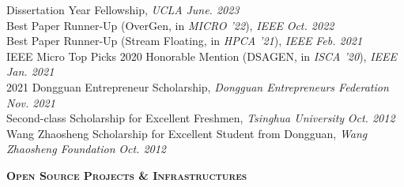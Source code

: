 \documentclass[a4paper]{article}
\newenvironment{changemargin}[2]{%
  \begin{list}{}{%
    \setlength{\topsep}{0pt}%
    \setlength{\leftmargin}{#1}%
    \setlength{\rightmargin}{#2}%
    \setlength{\listparindent}{\parindent}%
    \setlength{\itemindent}{\parindent}%
    \setlength{\parsep}{\parskip}%
  }%
  \item[]}{\end{list}
}
\newcommand{\lineover}{
	\begin{changemargin}{-0.05in}{-0.05in}
		\vspace*{-8pt}
		\hrulefill \\
		\vspace*{-2pt}
	\end{changemargin}
}
\newcommand{\header}[1]{
	\begin{changemargin}{-0.5in}{-0.5in}
		\scshape{\large \textbf{#1}}\\
  	\lineover
	\end{changemargin}
}
\newenvironment{body} {
	\vspace*{-16pt}
	\begin{changemargin}{-0.5in}{-0.5in}
  }	
	{\end{changemargin}
}
\begin{document}
\begin{body}
	\vspace{14pt}
	Dissertation Year Fellowship, \emph{UCLA} \hfill{} \emph{June. 2023}\\
	\smallskip
	Best Paper Runner-Up (OverGen, in \emph{MICRO '22}), \emph{IEEE} \hfill{} \emph{Oct. 2022}\\
	\smallskip
	Best Paper Runner-Up (Stream Floating, in \emph{HPCA '21}), \emph{IEEE} \hfill{} \emph{Feb. 2021}\\
	\smallskip
	IEEE Micro Top Picks 2020 Honorable Mention (DSAGEN, in \emph{ISCA '20}), \emph{IEEE} \hfill{} \emph{Jan. 2021}\\
	\smallskip
	2021 Dongguan Entrepreneur Scholarship, \emph{Dongguan Entrepreneurs Federation} \hfill{} \emph{Nov. 2021}\\
	\smallskip
	Second-class Scholarship for Excellent Freshmen, \emph{Tsinghua University} \hfill{} \emph{Oct. 2012}\\
	\smallskip
	Wang Zhaosheng Scholarship for Excellent Student from Dongguan, \emph{Wang Zhaosheng Foundation} \hfill{} \emph{Oct. 2012}\\
\end{body}

\smallskip
\smallskip

\header{Open Source Projects \& Infrastructures}
\end{document}
